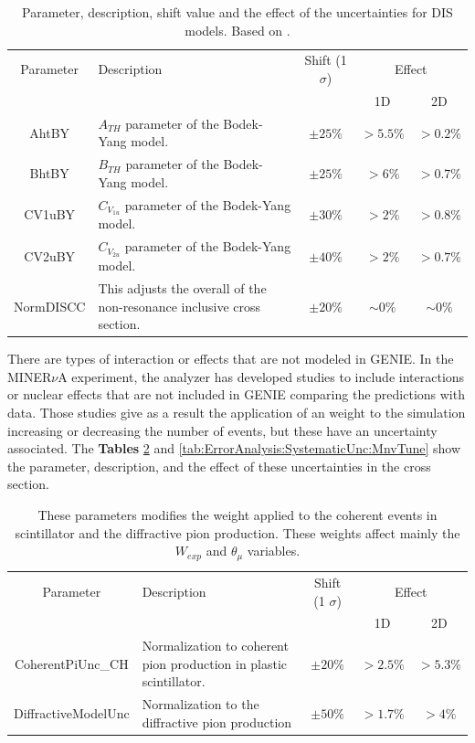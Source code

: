 \begin{table}[!htb]
    \centering
    \begin{tabular}{c|p{2.1in}|c|c|c}
        \hline 
        Parameter & Description  & Shift (1 $\sigma$) & \multicolumn{2}{c}{Effect} \\
         & & & 1D & 2D \\
        \hline  
        AhtBY & $A_{TH}$ parameter of the Bodek-Yang model. & $\pm25\%$ & $>5.5\%$ & $>0.2\%$\\ \hline
        BhtBY & $B_{TH}$ parameter of the Bodek-Yang model. & $\pm25\%$ & $>6\%$ & $>0.7\%$ \\ \hline
        CV1uBY & $C_{V_{1u}}$ parameter of the Bodek-Yang model. & $\pm30\%$ & $>2\%$ & $>0.8\%$ \\ \hline
        CV2uBY & $C_{V_{2u}}$ parameter of the Bodek-Yang model. & $\pm40\%$ & $>2\%$ & $>0.7\%$ \\ \hline
        NormDISCC & This adjusts the overall of the non-resonance inclusive cross section. & $\pm20\%$ & $\sim0\%$ & $\sim0\%$ \\ \hline 
    \end{tabular}
    \caption{Parameter, description, shift value and the effect of the uncertainties for DIS models. Based on \cite{GENIEUnc}.}
    \label{tab:ErrorAnalysis:SystematicUnc:GenieDISmodels}
\end{table}

There are types of interaction or effects that are not modeled in GENIE. In the MINER$\nu$A experiment, the analyzer has developed studies to include interactions or nuclear effects that are not included in GENIE comparing the predictions with data. Those studies give as a result the application of an weight to the simulation increasing or decreasing the number of events, but these have an uncertainty associated. The \textbf{Tables} \ref{tab:ErrorAnalysis:SystematicUnc:CoherentandDifractive} and \ref{tab:ErrorAnalysis:SystematicUnc:MnvTune} show the parameter, description, and the effect of these uncertainties in the cross section.

\begin{table}[!htb]
    \centering
    \begin{tabular}{c|p{2in}|c|c|c}
        \hline 
        Parameter & Description & Shift (1 $\sigma$) & \multicolumn{2}{c}{Effect} \\
         & & & 1D & 2D \\
        \hline  
        CoherentPiUnc\_CH & Normalization to coherent pion production in plastic scintillator. & $\pm20\%$ & $>2.5\%$ & $>5.3\%$\\ \hline
        DiffractiveModelUnc & Normalization to the diffractive pion production & $\pm50\%$ & $>1.7\%$ & $>4\%$ \\ \hline 
    \end{tabular}
    \caption{These parameters modifies the weight applied to the coherent events in scintillator and the diffractive pion production. These weights affect mainly the $W_{exp}$ and $\theta_\mu$ variables.}
    \label{tab:ErrorAnalysis:SystematicUnc:CoherentandDifractive}
\end{table}

